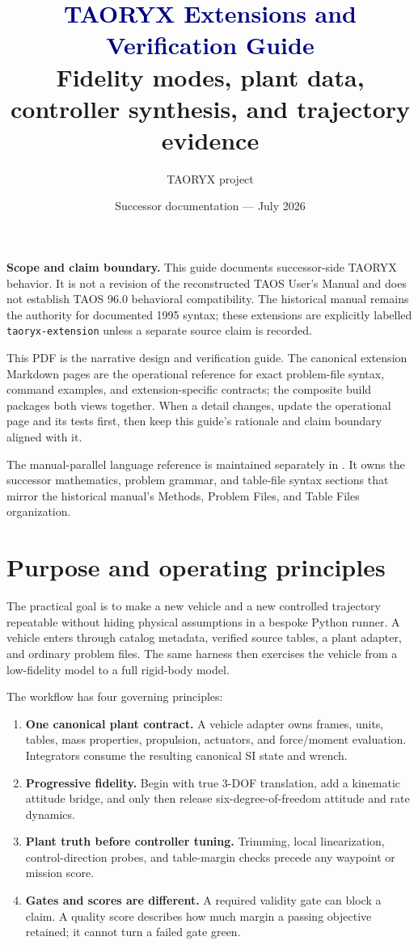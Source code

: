 \documentclass[11pt]{article}
\title{\textcolor{navy}{TAORYX Extensions and Verification Guide}\\
  \large Fidelity modes, plant data, controller synthesis, and trajectory evidence}
\author{TAORYX project}
\date{Successor documentation --- July 2026}
\newcommand{\taoryx}{TAORYX}
\newcommand{\pathcode}[1]{\path{#1}}
\newcommand{\claimbox}[1]{%
  \par\noindent\colorbox{paleblue}{\parbox{0.94\linewidth}{#1}}\par
}
\begin{document}
\maketitle
\thispagestyle{empty}

\claimbox{\textbf{Scope and claim boundary.} This guide documents successor-side
\taoryx{} behavior. It is not a revision of the reconstructed TAOS User's Manual
and does not establish TAOS 96.0 behavioral compatibility. The historical manual
remains the authority for documented 1995 syntax; these extensions are explicitly
labelled \texttt{taoryx-extension} unless a separate source claim is recorded.}

This PDF is the narrative design and verification guide. The canonical
extension Markdown pages are the operational reference for exact problem-file
syntax, command examples, and extension-specific contracts; the composite
build packages both views together. When a detail changes, update the
operational page and its tests first, then keep this guide's rationale and
claim boundary aligned with it.

The manual-parallel language reference is maintained separately in
\pathcode{docs/latex/taoryx_language_reference.tex}. It owns the successor
mathematics, problem grammar, and table-file syntax sections that mirror the
historical manual's Methods, Problem Files, and Table Files organization.

\tableofcontents
\newpage

\section{Purpose and operating principles}

The practical goal is to make a new vehicle and a new controlled trajectory
repeatable without hiding physical assumptions in a bespoke Python runner. A
vehicle enters through catalog metadata, verified source tables, a plant adapter,
and ordinary problem files. The same harness then exercises the vehicle from a
low-fidelity model to a full rigid-body model.

The workflow has four governing principles:

\begin{enumerate}
  \item \textbf{One canonical plant contract.} A vehicle adapter owns frames,
    units, tables, mass properties, propulsion, actuators, and force/moment
    evaluation. Integrators consume the resulting canonical SI state and wrench.
  \item \textbf{Progressive fidelity.} Begin with true 3-DOF translation, add a
    kinematic attitude bridge, and only then release six-degree-of-freedom
    attitude and rate dynamics.
  \item \textbf{Plant truth before controller tuning.} Trimming, local
    linearization, control-direction probes, and table-margin checks precede any
    waypoint or mission score.
  \item \textbf{Gates and scores are different.} A required validity gate can
    block a claim. A quality score describes how much margin a passing objective
    retained; it cannot turn a failed gate green.
\end{enumerate}
\end{document}
